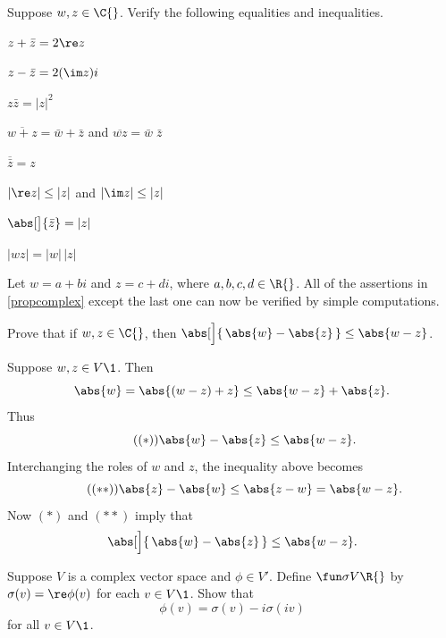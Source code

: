 
\exercise
Suppose $w, z \in \C{}$. Verify the following equalities and inequalities.
\begin{subtheorem} \addtolength{\itemsep}{3bp}
\item
$z + \bar{z} = 2 \re z$

\item
$z - \bar{z} = 2( \im z)i$

\item
$z \bar{z} = |z|^2$

\item
$\overline{w + z} = \bar{w} + \bar{z}$  and $\overline{wz} = \bar{w} \; \bar{z}$

\item
$\overline{\bar{z}} = z$

\item
$| \re z | \le |z|$ and $| \im z | \le |z|$

\item
$\abs[\big]{\bar{z}} = |z|$

\item
$|wz| = |w|\,|z|$
\end{subtheorem}

\begin{Solution}
Let $w = a + bi$ and $z = c + di$, where $a, b, c, d \in \R{}$. All of the assertions in \ref{propcomplex} except the last one can now be verified by simple computations.
\end{Solution}

\exercise
Prove that if $w, z \in \C{}$, then $\abs[\Big]{\, \abs{w} - \abs{z} \,} \le \abs{w-z}$. \label{4reverse}

\begin{Solution}
Suppose $w, z \in V\1$. Then
\[
\abs{w} = \abs{(w-z) + z} \le \abs{w-z} + \abs{z}.
\]
Thus
\[ \tag{$(*)$}
\abs{w} - \abs{z} \le \abs{w-z}.
\]
Interchanging the roles of $w$ and $z$, the inequality above becomes
\[ \tag{$(**)$}
\abs{z} - \abs{w} \le \abs{z-w} = \abs{w-z}.
\]
Now $(*)$ and $(**)$ imply that
\[
\abs[\Big]{\, \abs{w} - \abs{z} \,} \le \abs{w-z}.
\]
\end{Solution}

\exercise
Suppose $V$ is a complex vector space and $\phi \in V'\!$. Define $\fun \sigma V {\R{}}$ by
$\sigma(v) = \re \phi(v)$ for each $v \in V\1$. Show that
\[
\phi(v) = \sigma(v) - i \sigma(iv)
\]
for all $v \in V\1$.

